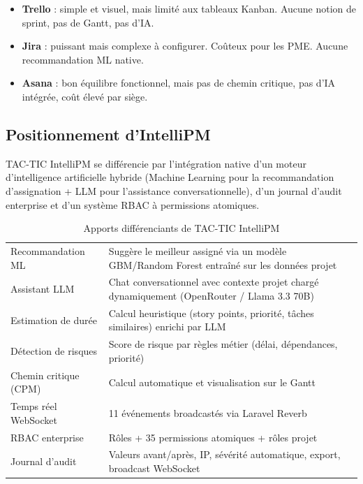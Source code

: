 \begin{itemize}
  \item \textbf{Trello} : simple et visuel, mais limité aux tableaux Kanban.
        Aucune notion de sprint, pas de Gantt, pas d'IA.
  \item \textbf{Jira} : puissant mais complexe à configurer. Coûteux pour les
        PME. Aucune recommandation ML native.
  \item \textbf{Asana} : bon équilibre fonctionnel, mais pas de chemin critique,
        pas d'IA intégrée, coût élevé par siège.
\end{itemize}

\subsection{Positionnement d'IntelliPM}

TAC-TIC IntelliPM se différencie par l'intégration native d'un moteur
d'intelligence artificielle hybride (Machine Learning pour la recommandation
d'assignation + LLM pour l'assistance conversationnelle), d'un journal d'audit
enterprise et d'un système RBAC à permissions atomiques.

\begin{table}[H]
  \centering
  \caption{Apports différenciants de TAC-TIC IntelliPM}
  \label{tab:apports}
  \begin{tabularx}{\textwidth}{L{4.5cm}X}
    \toprule
     &  \\
    \midrule
    Recommandation ML       & Suggère le meilleur assigné via un modèle
                              GBM/Random Forest entraîné sur les données projet \\
    Assistant LLM           & Chat conversationnel avec contexte projet chargé
                              dynamiquement (OpenRouter / Llama 3.3 70B) \\
    Estimation de durée     & Calcul heuristique (story points, priorité, tâches
                              similaires) enrichi par LLM \\
    Détection de risques    & Score de risque par règles métier (délai, dépendances,
                              priorité) \\
    Chemin critique (CPM)   & Calcul automatique et visualisation sur le Gantt \\
    Temps réel WebSocket    & 11 événements broadcastés via Laravel Reverb \\
    RBAC enterprise         & Rôles + 35 permissions atomiques + rôles projet \\
    Journal d'audit         & Valeurs avant/après, IP, sévérité automatique,
                              export, broadcast WebSocket \\
    \bottomrule
  \end{tabularx}
\end{table}

